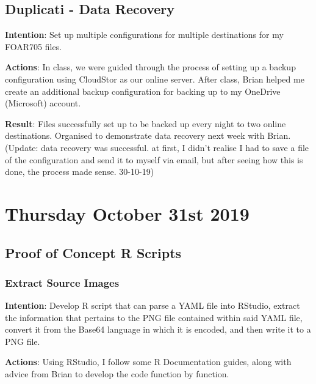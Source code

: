\documentclass{article}
\begin{document}
\subsection{Duplicati - Data Recovery}

\textbf{Intention}: Set up multiple configurations for multiple destinations for my FOAR705 files.

\textbf{Actions}: In class, we were guided through the process of setting up a backup configuration using CloudStor as our online server. After class, Brian helped me create an additional backup configuration for backing up to my OneDrive (Microsoft) account.


\textbf{Result}: Files successfully set up to be backed up every night to two online destinations. Organised to demonstrate data recovery next week with Brian. (Update: data recovery was successful. at first, I didn't realise I had to save a file of the configuration and send it to myself via email, but after seeing how this is done, the process made sense. 30-10-19)

\section{Thursday October 31st 2019}

\subsection{Proof of Concept R Scripts}

\subsubsection{Extract Source Images}

\textbf{Intention}: Develop R script that can parse a YAML file into RStudio, extract the information that pertains to the PNG file contained within said YAML file, convert it from the Base64 language in which it is encoded, and then write it to a PNG file.

\textbf{Actions}: Using RStudio, I follow some R Documentation guides, along with advice from Brian to develop the code function by function.
\end{document}
